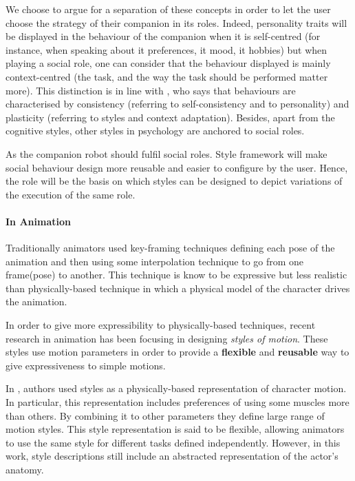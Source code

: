 \documentclass[a4paper,twocolumn]{svjour3}
\begin{document}
We choose to argue for a separation of these concepts in order to let the user choose the strategy of their companion in its roles. 
Indeed, personality traits will be displayed in the behaviour of the companion when it is self-centred (for instance, when speaking about it preferences, it mood, it hobbies) but when playing a social role, one can consider that the behaviour displayed is mainly context-centred (the task, and the way the task should be performed matter more). 
This distinction is in line with \cite{Huteau}, who says that behaviours are characterised by consistency (referring to self-consistency and to personality) and plasticity (referring to styles and context adaptation).
Besides, apart from the cognitive styles, other styles in psychology are anchored to social roles.


As the companion robot should fulfil social roles.
Style framework  will make social behaviour design more reusable and easier to configure by the user. 
Hence, the role will be the basis on which styles can be designed to depict variations of the execution of the same role. 


\paragraph{In Animation}
Traditionally animators used key-framing techniques defining each pose of the animation and then using some interpolation technique to go from one frame(pose) to another. 
This technique is know to be expressive but less realistic than physically-based technique in which a physical model of the character drives the animation.

In order to give more expressibility to physically-based techniques, recent research in animation has been focusing in designing \emph{styles of motion}. 
These styles use motion parameters in order to provide a \textbf{flexible} and \textbf{reusable} way to give expressiveness to simple motions.

In \cite{Liu2005}, authors used styles as a physically-based representation of character motion. 
In particular, this representation includes preferences of using some muscles more than others.
By combining it to other parameters they define large range of motion styles.
This style representation is said to be flexible, allowing animators to use the same style for different tasks defined independently. However, in this work, style descriptions still include an abstracted representation of the actor's anatomy.
\end{document}

